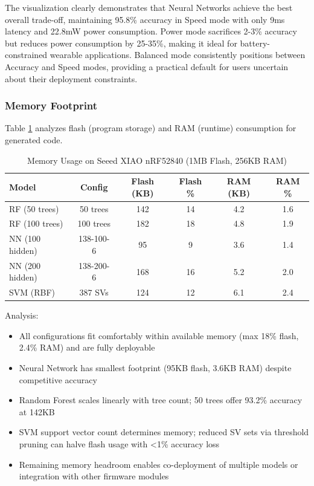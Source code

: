 The visualization clearly demonstrates that Neural Networks achieve the best overall trade-off, maintaining 95.8\% accuracy in Speed mode with only 9ms latency and 22.8mW power consumption. Power mode sacrifices 2-3\% accuracy but reduces power consumption by 25-35\%, making it ideal for battery-constrained wearable applications. Balanced mode consistently positions between Accuracy and Speed modes, providing a practical default for users uncertain about their deployment constraints.

\subsubsection{Memory Footprint}
Table \ref{tab:memory_usage} analyzes flash (program storage) and RAM (runtime) consumption for generated code.

\begin{table}[H]
    \centering
    \caption{Memory Usage on Seeed XIAO nRF52840 (1MB Flash, 256KB RAM)}
    \small
    \begin{tabular}{@{}lccccc@{}}
        \toprule
        Model & Config & Flash (KB) & Flash \% & RAM (KB) & RAM \% \\ 
        \midrule
        RF (50 trees) & 50 trees & 142 & 14 & 4.2 & 1.6 \\
        RF (100 trees) & 100 trees & 182 & 18 & 4.8 & 1.9 \\
        \midrule
        NN (100 hidden) & 138-100-6 & 95 & 9 & 3.6 & 1.4 \\
        NN (200 hidden) & 138-200-6 & 168 & 16 & 5.2 & 2.0 \\
        \midrule
        SVM (RBF) & 387 SVs & 124 & 12 & 6.1 & 2.4 \\
        \bottomrule
    \end{tabular}
    \label{tab:memory_usage}
\end{table}

Analysis:
\begin{itemize}
    \item All configurations fit comfortably within available memory (max 18\% flash, 2.4\% RAM) and are fully deployable
    \item Neural Network has smallest footprint (95KB flash, 3.6KB RAM) despite competitive accuracy
    \item Random Forest scales linearly with tree count; 50 trees offer 93.2\% accuracy at 142KB
    \item SVM support vector count determines memory; reduced SV sets via threshold pruning can halve flash usage with <1\% accuracy loss
    \item Remaining memory headroom enables co-deployment of multiple models or integration with other firmware modules
\end{itemize}

